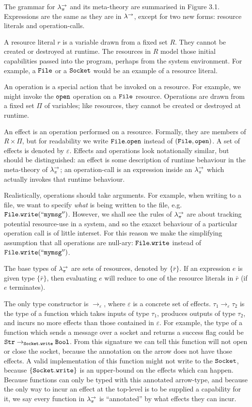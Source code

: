 The grammar for $\lambda^{\rightarrow}_{\pi}$ and its meta-theory are summarised in Figure 3.1. Expressions are the same as they are in $\lambda^{\rightarrow}$, except for two new forms: resource literals and operation-calls.

A resource literal $r$ is a variable drawn from a fixed set $R$. They cannot be created or destroyed at runtime. The resources in $R$ model those initial capabilities passed into the program, perhaps from the system environment. For example, a $\mathtt{File}$ or a $\mathtt{Socket}$ would be an example of a resource literal.

An operation is a special action that be invoked on a resource. For example, we might invoke the $\mathtt{open}$ operation on a $\mathtt{File}$ resource. Operations are drawn from a fixed set $\Pi$ of variables; like resources, they cannot be created or destroyed at runtime.

An effect is an operation performed on a resource. Formally, they are members of $R \times \Pi$, but for readability we write $\mathtt{File.open}$ instead of $\mathtt{(File, open)}$. A set of effects is denoted by $\varepsilon$. Effects and operations look notationally similar, but should be distinguished: an effect is some description of runtime behaviour in the meta-theory of $\lambda^{\rightarrow}_{\pi}$; an operation-call is an expression inside an $\lambda^{\rightarrow}_{\pi}$ which actually invokes that runtime behaviour.

Realistically, operations should take arguments. For example, when writing to a file, we want to specify \textit{what} is being written to the file, e.g. $\mathtt{File.write(``mymsg'')}$. However, we shall see the rules of $\lambda^{\rightarrow}_{\pi}$ are about tracking potential resource-use in a system, and so the exaxct behaviour of a particular operation call is of little interset. For this reason we make the simplifying assumption that all operations are null-ary: $\mathtt{File.write}$ instead of $\mathtt{File.write(``mymsg'')}$.

The base types of $\lambda^{\rightarrow}_{\pi}$ are sets of resources, denoted by $\{ \bar r \}$. If an expression $e$ is given type $\{ \bar r \}$, then evaluating $e$ will reduce to one of the resource literals in $\bar r$ (if $e$ terminates).

The only type constructor is $\rightarrow_{\varepsilon}$, where $\varepsilon$ is a concrete set of effects. $\tau_1 \rightarrow_{\varepsilon} \tau_2$ is the type of a function which takes inputs of type $\tau_1$, produces outputs of type $\tau_2$, and incurs no more effects than those contained in $\varepsilon$. For example, the type of a function which sends a message over a socket and returns a success flag could be $\mathtt{Str} \rightarrow_{\mathtt{Socket.write}} \mathtt{Bool}$. From this signature we can tell this function will not open or close the socket, because the annotation on the arrow does not have those effects. A valid implementation of this function might not write to the $\mathtt{Socket}$, because $\{ \mathtt{Socket.write} \}$ is an upper-bound on the effects which can happen. Because functions can only be typed with this annotated arrow-type, and because the only way to incur an effect at the top-level is to be supplied a capability for it, we say every function in $\lambda^{\rightarrow}_{\pi}$ is ``annotated'' by what effects they can incur.

